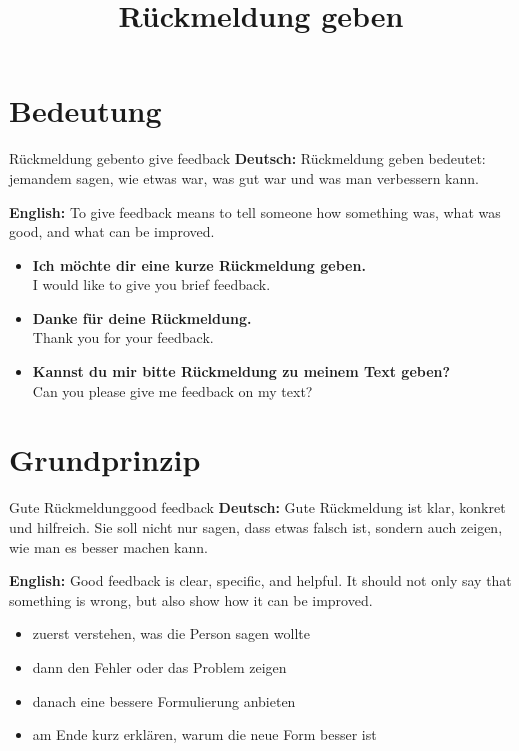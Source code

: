 \documentclass[a4paper,11pt]{article}
\title{Rückmeldung geben}
\date{}
\newcommand{\GermanText}[1]{\textbf{Deutsch: }#1\par}
\newcommand{\EnglishText}[1]{{\small\color{SoftGray}\textbf{English: }#1\par}}
\newcommand{\ExampleItem}[2]{\item \textbf{#1}\\{\small\color{SoftGray}#2}}
\begin{document}
    \maketitle
    \tableofcontents
    \newpage
    
    
    \section{Bedeutung}
        
        \begin{grammarentry}{Rückmeldung geben}{to give feedback}
            \GermanText{Rückmeldung geben bedeutet: jemandem sagen, wie etwas war, was gut war und was man verbessern kann.}
            \EnglishText{To give feedback means to tell someone how something was, what was good, and what can be improved.}
            
            \begin{exbox}
                \begin{itemize}
                    \ExampleItem{Ich möchte dir eine kurze Rückmeldung geben.}{I would like to give you brief feedback.}
                    \ExampleItem{Danke für deine Rückmeldung.}{Thank you for your feedback.}
                    \ExampleItem{Kannst du mir bitte Rückmeldung zu meinem Text geben?}{Can you please give me feedback on my text?}
                \end{itemize}
            \end{exbox}
        \end{grammarentry}
    
    
    \section{Grundprinzip}
        
        \begin{grammarentry}{Gute Rückmeldung}{good feedback}
            \GermanText{Gute Rückmeldung ist klar, konkret und hilfreich. Sie soll nicht nur sagen, dass etwas falsch ist, sondern auch zeigen, wie man es besser machen kann.}
            \EnglishText{Good feedback is clear, specific, and helpful. It should not only say that something is wrong, but also show how it can be improved.}
            
            \begin{itemize}
                \item zuerst verstehen, was die Person sagen wollte
                \item dann den Fehler oder das Problem zeigen
                \item danach eine bessere Formulierung anbieten
                \item am Ende kurz erklären, warum die neue Form besser ist
            \end{itemize}
        \end{grammarentry}
    
\end{document}
